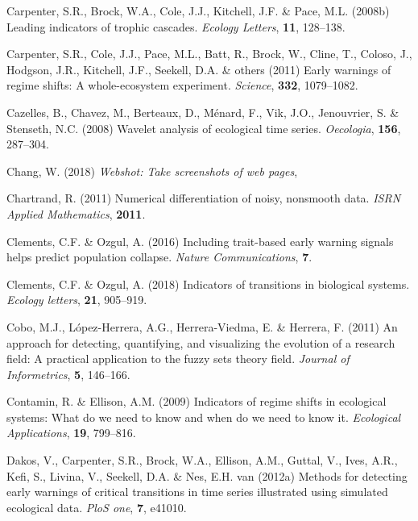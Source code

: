 \documentclass[12pt,twoside,openany]{reedthesis}
\begin{document}
\leavevmode\hypertarget{ref-carpenter_leading_2008}{}%
Carpenter, S.R., Brock, W.A., Cole, J.J., Kitchell, J.F. \& Pace, M.L. (2008b) Leading indicators of trophic cascades. \emph{Ecology Letters}, \textbf{11}, 128--138.

\leavevmode\hypertarget{ref-carpenter2011early}{}%
Carpenter, S.R., Cole, J.J., Pace, M.L., Batt, R., Brock, W., Cline, T., Coloso, J., Hodgson, J.R., Kitchell, J.F., Seekell, D.A. \& others (2011) Early warnings of regime shifts: A whole-ecosystem experiment. \emph{Science}, \textbf{332}, 1079--1082.

\leavevmode\hypertarget{ref-cazelles2008wavelet}{}%
Cazelles, B., Chavez, M., Berteaux, D., Ménard, F., Vik, J.O., Jenouvrier, S. \& Stenseth, N.C. (2008) Wavelet analysis of ecological time series. \emph{Oecologia}, \textbf{156}, 287--304.

\leavevmode\hypertarget{ref-webshot}{}%
Chang, W. (2018) \emph{Webshot: Take screenshots of web pages},

\leavevmode\hypertarget{ref-chartrand2011numerical}{}%
Chartrand, R. (2011) Numerical differentiation of noisy, nonsmooth data. \emph{ISRN Applied Mathematics}, \textbf{2011}.

\leavevmode\hypertarget{ref-clements_including_2016}{}%
Clements, C.F. \& Ozgul, A. (2016) Including trait-based early warning signals helps predict population collapse. \emph{Nature Communications}, \textbf{7}.

\leavevmode\hypertarget{ref-clements2018indicators}{}%
Clements, C.F. \& Ozgul, A. (2018) Indicators of transitions in biological systems. \emph{Ecology letters}, \textbf{21}, 905--919.

\leavevmode\hypertarget{ref-cobo2011approach}{}%
Cobo, M.J., López-Herrera, A.G., Herrera-Viedma, E. \& Herrera, F. (2011) An approach for detecting, quantifying, and visualizing the evolution of a research field: A practical application to the fuzzy sets theory field. \emph{Journal of Informetrics}, \textbf{5}, 146--166.

\leavevmode\hypertarget{ref-contamin_indicators_2009}{}%
Contamin, R. \& Ellison, A.M. (2009) Indicators of regime shifts in ecological systems: What do we need to know and when do we need to know it. \emph{Ecological Applications}, \textbf{19}, 799--816.

\leavevmode\hypertarget{ref-dakos2012methods}{}%
Dakos, V., Carpenter, S.R., Brock, W.A., Ellison, A.M., Guttal, V., Ives, A.R., Kefi, S., Livina, V., Seekell, D.A. \& Nes, E.H. van (2012a) Methods for detecting early warnings of critical transitions in time series illustrated using simulated ecological data. \emph{PloS one}, \textbf{7}, e41010.
\end{document}
